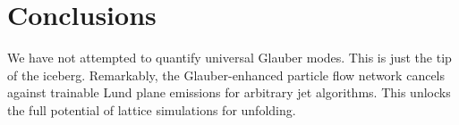 \section{Conclusions}\label{sec:conclusions}

We have not attempted to quantify universal Glauber modes. This is just
the tip of the iceberg. Remarkably, the Glauber-enhanced particle flow
network cancels against trainable Lund plane emissions for arbitrary jet
algorithms. This unlocks the full potential of lattice simulations for
unfolding.

